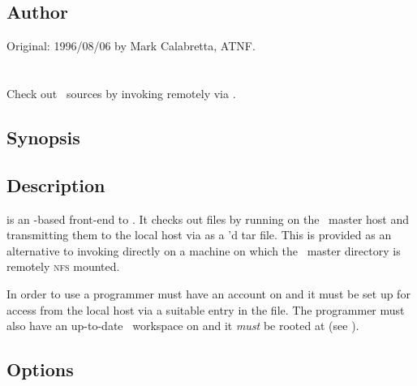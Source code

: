 \subsection*{Author}
 
Original: 1996/08/06 by Mark Calabretta, ATNF.

 
\newpage
\section{}
\label{rao}
 
Check out \aipspp\ sources by invoking  remotely via .

\subsection*{Synopsis}
 
\begin{synopsis}
\end{synopsis}
 
\subsection*{Description}
 
 is an -based front-end to .  It checks out
files by running  on the \aipspp\ master host and transmitting
them to the local host via  as a 'd tar file.  This
is provided as an alternative to invoking  directly on a machine
on which the \aipspp\ master directory is remotely \textsc{nfs} mounted.
 
In order to use  a programmer must have an account on
 and it must be set up for  access from the
local host via a suitable entry in the  file.  The programmer
must also have an up-to-date \aipspp\ workspace on  and
it \emph{must} be  rooted at  (see ).
 
\subsection*{Options}
 
